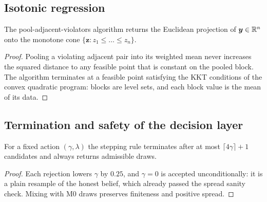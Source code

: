 \subsection{Isotonic regression}

\begin{proposition}[PAVA]
The pool-adjacent-violators algorithm returns the Euclidean projection of $\bm y\in\mathbb{R}^n$ onto the monotone cone
$\{\bm z:z_1\le\dots\le z_n\}$.
\end{proposition}
\begin{proof}
Pooling a violating adjacent pair into its weighted mean never increases the squared distance to any feasible point that is constant on the
pooled block. The algorithm terminates at a feasible point satisfying the KKT conditions of the convex quadratic program: blocks are level sets,
and each block value is the mean of its data.
\end{proof}

\subsection{Termination and safety of the decision layer}

\begin{proposition}
For a fixed action $(\gamma,\lambda)$ the stepping rule terminates after at most $\lceil4\gamma\rceil+1$ candidates and always returns admissible
draws.
\end{proposition}
\begin{proof}
Each rejection lowers $\gamma$ by $0.25$, and $\gamma=0$ is accepted unconditionally: it is a plain resample of the honest belief, which already
passed the spread sanity check. Mixing with M0 draws preserves finiteness and positive spread.
\end{proof}
